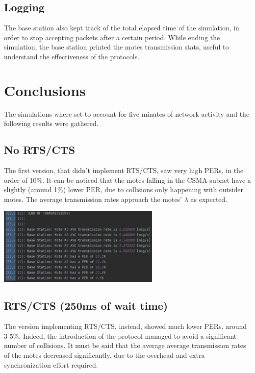 \documentclass{article}
\begin{document}
\subsection{Logging}
The base station also kept track of the total elapsed time of the simulation, in order to stop accepting packets after a certain period. While ending the simulation, the base station printed the motes transmission stats, useful to understand the effectiveness of the protocols.

\newpage

\section{Conclusions}
The simulations where set to account for five minutes of network activity and the following results were gathered.

\subsection{No RTS/CTS}
The first version, that didn't implement RTS/CTS, saw very high PERs, in the order of 10\%. It can be noticed that the motes falling in the CSMA subnet have a slightly (around 1\%) lower PER, due to collisions only happening with outsider motes. The average transmission rates approach the motes' $\lambda$ as expected.

\begin{center}
  \includegraphics[width=8cm]{images/NO_RCTS.jpg}
\end{center}

\subsection{RTS/CTS (250ms of wait time)}
The version implementing RTS/CTS, instead, showed much lower PERs, around 3-5\%. Indeed, the introduction of the protocol managed to avoid a significant number of collisions. It must be said that the average average transmission rates of the motes decreased significantly, due to the overhead and extra synchronization effort required.
\end{document}
